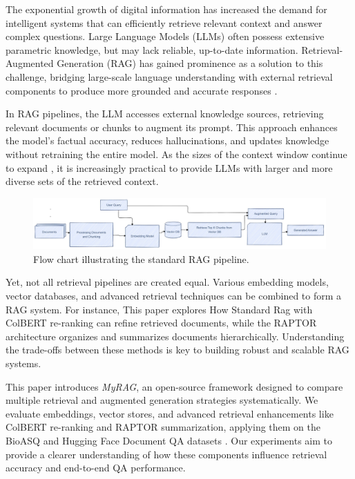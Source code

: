 \documentclass{scrartcl}
\begin{document}
The exponential growth of digital information has increased the demand for intelligent systems that can efficiently retrieve relevant context and answer complex questions. Large Language Models (LLMs) often possess extensive parametric knowledge, but may lack reliable, up-to-date information. Retrieval-Augmented Generation (RAG) has gained prominence as a solution to this challenge, bridging large-scale language understanding with external retrieval components to produce more grounded and accurate responses \cite{lewis2020retrieval, guu2020realm}.

In RAG pipelines, the LLM accesses external knowledge sources, retrieving relevant documents or chunks to augment its prompt. This approach enhances the model’s factual accuracy, reduces hallucinations, and updates knowledge without retraining the entire model. As the sizes of the context window continue to expand \cite{liu2023lost}, it is increasingly practical to provide LLMs with larger and more diverse sets of the retrieved context.

\begin{figure}[h]
    \centering
    \includegraphics[width=\linewidth]{StandardRag.pdf} 
    \caption{Flow chart illustrating the standard RAG pipeline.}
    \label{fig:standard_rag_flow}
\end{figure}


Yet, not all retrieval pipelines are created equal. Various embedding models, vector databases, and advanced retrieval techniques can be combined to form a RAG system. For instance, This paper explores How Standard Rag with ColBERT \cite{khattab2020colbert} re-ranking can refine retrieved documents, while the RAPTOR architecture \cite{wu2021recursively, raptor2024} organizes and summarizes documents hierarchically. Understanding the trade-offs between these methods is key to building robust and scalable RAG systems.

This paper introduces \textit{MyRAG}, an open-source framework designed to compare multiple retrieval and augmented generation strategies systematically. We evaluate embeddings, vector stores, and advanced retrieval enhancements like ColBERT re-ranking and RAPTOR summarization, applying them on the BioASQ \cite{bioasq2023} and Hugging Face Document QA datasets \cite{huggingface2024docqa}. Our experiments aim to provide a clearer understanding of how these components influence retrieval accuracy and end-to-end QA performance.
\end{document}
